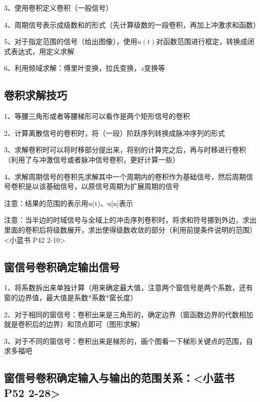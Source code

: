 3、使用卷积定义卷积（一般信号）

4、周期信号表示成级数和的形式（先计算级数的一段卷积，再加上冲激求和函数）

5、对于指定范围的信号（给出图像），使用$u(t)$对函数范围进行框定，转换成闭式表达式，用定义求解

6、利用频域求解：傅里叶变换，拉氏变换，$z$变换等



\subsection{卷积求解技巧}

1、等腰三角形或者等腰梯形可以看作是两个矩形信号的卷积

2、计算离散信号的卷积时，将（一段）阶跃序列转换成脉冲序列的形式

3、求解卷积时可以将时移部分提出来，将别的计算完之后，再与时移进行卷积（利用了与冲激信号或者脉冲信号卷积，更好计算一些）

4、求解周期信号的卷积先求解其中一个周期内的卷积作为基础信号，然后周期信号卷积是以该基础信号，以原信号周期为扩展周期的信号

注意：结果的范围的表示用u(t)、u[n]表示

注意：当半边的时域信号与全域上的冲击序列卷积时，将求和符号挪到外边，求出里面的卷积后将级数展开，求出使得级数收敛的部分（利用前提条件说明的范围）<小蓝书 P42 2-10>



\subsection{窗信号卷积确定输出信号}

1、将系数拆出来单独计算（用来确定最大值，注意两个窗信号是两个系数，还有窗的边界值，最大值是系数*系数*窗长度）

2、对于相同的窗信号：卷积出来是三角形的，确定边界（窗函数边界的代数相加就是卷积后的边界）和顶点即可（图形求解）

3、对于不同的窗信号：卷积出来是梯形的，画个图看一下梯形关键点的范围，自求多福吧



\subsection{窗信号卷积确定输入与输出的范围关系：<小蓝书 P52 2-28>}

